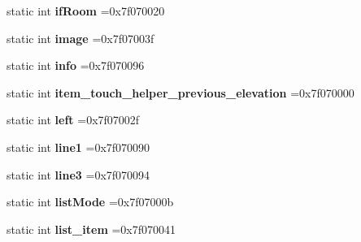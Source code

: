 \begin{DoxyCompactItemize}
static int {\bfseries if\+Room} =0x7f070020
\item 
\mbox{\label{classandroid_1_1support_1_1graphics_1_1drawable_1_1R_1_1id_aa4237a3d02d7b50f6dcaa95590e418b4}} 
static int {\bfseries image} =0x7f07003f
\item 
\mbox{\label{classandroid_1_1support_1_1graphics_1_1drawable_1_1R_1_1id_ae6250eb613f978e1f5a4083198454479}} 
static int {\bfseries info} =0x7f070096
\item 
\mbox{\label{classandroid_1_1support_1_1graphics_1_1drawable_1_1R_1_1id_ad6b1679dee5acda89852724e18c19733}} 
static int {\bfseries item\+\_\+touch\+\_\+helper\+\_\+previous\+\_\+elevation} =0x7f070000
\item 
\mbox{\label{classandroid_1_1support_1_1graphics_1_1drawable_1_1R_1_1id_ae6079ba30bd44448d6ea8f63b7621e23}} 
static int {\bfseries left} =0x7f07002f
\item 
\mbox{\label{classandroid_1_1support_1_1graphics_1_1drawable_1_1R_1_1id_aed1f39b205deff70d9d63dc7128923c6}} 
static int {\bfseries line1} =0x7f070090
\item 
\mbox{\label{classandroid_1_1support_1_1graphics_1_1drawable_1_1R_1_1id_afff67245989c2633ec9136825e4cbb03}} 
static int {\bfseries line3} =0x7f070094
\item 
\mbox{\label{classandroid_1_1support_1_1graphics_1_1drawable_1_1R_1_1id_abf6ff243710c295d5eb3a245900d9ee1}} 
static int {\bfseries list\+Mode} =0x7f07000b
\item 
\mbox{\label{classandroid_1_1support_1_1graphics_1_1drawable_1_1R_1_1id_ac94a853db3c293b5f4646609974f1df5}} 
static int {\bfseries list\+\_\+item} =0x7f070041
\item 
\mbox{\label{classandroid_1_1support_1_1graphics_1_1drawable_1_1R_1_1id_a2a17d34ad160f3864bc8c2d1801b3a88}} 

\end{DoxyCompactItemize}
